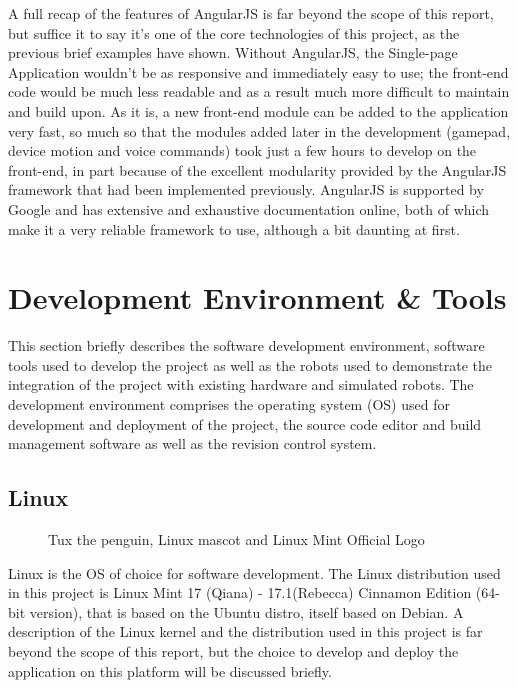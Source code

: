 A full recap of the features of AngularJS is far beyond the scope of this report, but suffice it to say it's one of the core
technologies of this project, as the previous brief examples have shown. Without AngularJS, the Single-page Application wouldn't be as
responsive and immediately easy to use; the front-end code would be much less readable and as a result much more difficult to maintain
and build upon. As it is, a new front-end module can be added to the application very fast, so much so that the modules added later in
the development (gamepad, device motion and voice commands) took just a few hours to develop on the front-end, in part because of the
excellent modularity provided by the AngularJS framework that had been implemented previously. AngularJS is supported by Google and has
extensive and exhaustive documentation online\cite{google10}, both of which make it a very reliable framework to use, although a bit
daunting at first.
\newpage
\section{Development Environment \& Tools}
This section briefly describes the software development environment, software tools used to develop the project as well as
the robots used to demonstrate the integration of the project with existing hardware and simulated robots. The development
environment comprises the operating system (OS) used for development and deployment of the project, the source code editor
and build management software as well as the revision control system.
\subsection{Linux} \label{linux}
\begin{figure}[H]
\centering
\subfloat{}
\subfloat{\frame{}}
\caption{Tux the penguin, Linux mascot and Linux Mint Official Logo}
\end{figure}
Linux is the OS of choice for software development. The Linux distribution used in this project is Linux Mint 17 (Qiana) - 17.1(Rebecca)
Cinnamon Edition (64-bit version), that is based on the Ubuntu distro, itself based on Debian. A description of the Linux kernel and the
distribution used in this project is far beyond the scope of this report, but the choice to develop and deploy the application on this
platform will be discussed briefly.\\

